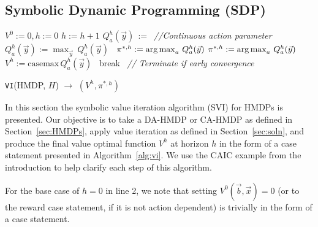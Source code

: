 \documentclass[twoside,11pt]{article}
\def\argmax{\operatornamewithlimits{arg\max}}
\newcommand{\casemax}{\mathrm{casemax}}
\begin{document}
\subsection{Symbolic Dynamic Programming (SDP)}

\incmargin{.5em}
\linesnumbered
\begin{algorithm}[t!]
\vspace{-.5mm}
\dontprintsemicolon
{}
\Begin
{
   $V^0:=0, h:=0$\;
   {
       $h:=h+1$\;
       {
              $Q_a^{h}(\vec{y})\,:=\,$\;
			  \emph{//Continuous action parameter}\;
               {
               $Q_a^{h}(\vec{y}) := \max_{\vec{y}} \, Q_a^{h}(\vec{y})$ $\,$ \;
               $\pi^{*,h} := \argmax_{a} \, Q_a^{h}(\vec{y})$\;
               } 
               \Else 
               { $\pi^{*,h} := \argmax_{a} \, Q_a^{h}(\vec{y})$ \; }
        }
       $V^{h} := \casemax \, Q_a^{h}(\vec{y})$ $\,$ \;
           {break $\,$ \emph{// Terminate if early convergence}\;}
   }
      \;
}
\caption{\footnotesize \texttt{VI}(HMDP, $H$) $\longrightarrow$ $(V^h,\pi^{*,h})$ \label{alg:vi}}
\vspace{-1mm}
\end{algorithm}
\decmargin{.5em}
In this section the symbolic value iteration algorithm (SVI) for HMDPs is presented.
Our objective is to take a DA-HMDP or CA-HMDP as defined in Section~\ref{sec:HMDPs}, apply value
iteration as defined in Section~\ref{sec:soln}, and produce
the final value optimal function $V^h$ at horizon $h$ in the form
of a case statement presented in Algorithm~\ref{alg:vi}. 
We use the \textsc{CAIC} example from the introduction to help clarify each step of this algorithm. 

For the base case of $h=0$ in line 2, we note that setting $V^0(\vec{b},\vec{x}) = 0$
(or to the reward case statement, if it is not action dependent)
is trivially in the form of a case statement.
\end{document}
